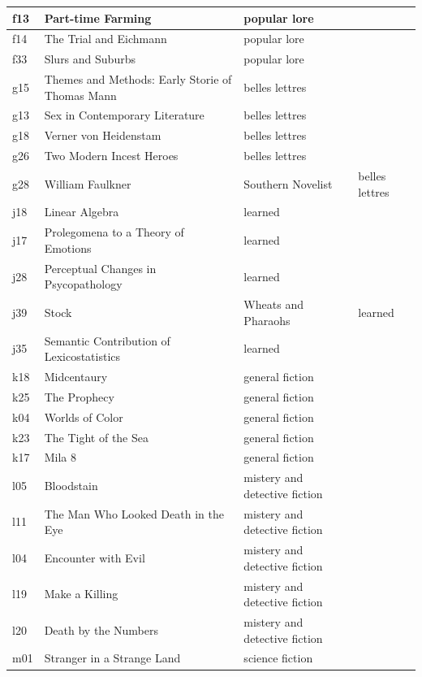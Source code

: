 \documentclass[twoside]{article}
\begin{document}
\begin{table}[!ht]
\begin{tabular}{|l|l|l|l|}
        f13 & Part-time Farming & popular lore & ~ \\ \hline
        f14 & The Trial and Eichmann & popular lore & ~ \\ \hline
        f33 & Slurs and Suburbs & popular lore & ~ \\ \hline
        g15 & Themes and Methods: Early Storie of Thomas Mann & belles lettres & ~ \\ \hline
        g13 & Sex in Contemporary Literature & belles lettres & ~ \\ \hline
        g18 & Verner von Heidenstam & belles lettres & ~ \\ \hline
        g26 & Two Modern Incest Heroes & belles lettres & ~ \\ \hline
        g28 & William Faulkner & Southern Novelist & belles lettres \\ \hline
        j18 & Linear Algebra & learned & ~ \\ \hline
        j17 & Prolegomena to a Theory of Emotions & learned & ~ \\ \hline
        j28 & Perceptual Changes in Psycopathology & learned & ~ \\ \hline
        j39 & Stock & Wheats and Pharaohs & learned \\ \hline
        j35 & Semantic Contribution of Lexicostatistics & learned & ~ \\ \hline
        k18 & Midcentaury & general fiction & ~ \\ \hline
        k25 & The Prophecy & general fiction & ~ \\ \hline
        k04 & Worlds of Color & general fiction & ~ \\ \hline
        k23 & The Tight of the Sea & general fiction & ~ \\ \hline
        k17 & Mila 8 & general fiction & ~ \\ \hline
        l05 & Bloodstain & mistery and detective fiction & ~ \\ \hline
        l11 & The Man Who Looked Death in the Eye & mistery and detective fiction & ~ \\ \hline
        l04 & Encounter with Evil & mistery and detective fiction & ~ \\ \hline
        l19 & Make a Killing & mistery and detective fiction & ~ \\ \hline
        l20 & Death by the Numbers & mistery and detective fiction & ~ \\ \hline
        m01 & Stranger in a Strange Land & science fiction & ~ \\ \hline

\end{tabular}
\end{table}
\end{document}
